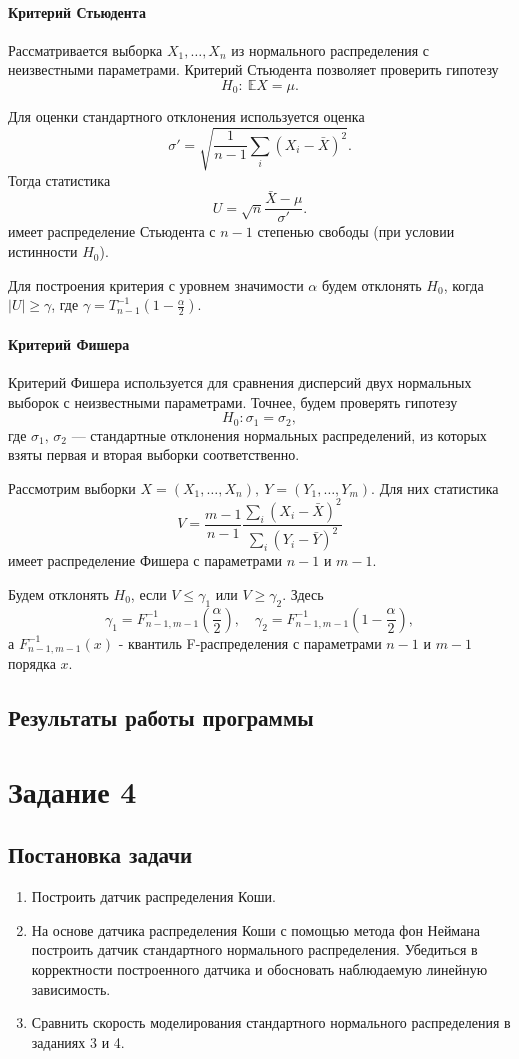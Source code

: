 \documentclass[16pt]{article}
\begin{document}
\paragraph{Критерий Стьюдента}
Рассматривается выборка $X_1, \ldots, X_n$ из нормального распределения с неизвестными параметрами. Критерий Стьюдента позволяет проверить гипотезу
$$H_0\colon\ \mathbb{E}X = \mu.$$

Для оценки стандартного отклонения используется оценка
$$\sigma' = \sqrt{\dfrac{1}{n-1}\sum_i(X_i - \bar X)^2}.$$
Тогда статистика
$$U = \sqrt{n}\frac{\bar X - \mu}{\sigma'}.$$
имеет распределение Стьюдента с $n - 1$ степенью свободы (при условии истинности $H_0$).

Для построения критерия с уровнем значимости $\alpha$ будем отклонять $H_0$,
когда $|U| \geq \gamma$, где $\gamma = T_{n - 1}^{-1}\left(1 - \frac{\alpha}{2}\right).$

\paragraph{Критерий Фишера}
Критерий Фишера используется для сравнения дисперсий двух нормальных выборок с неизвестными параметрами. Точнее, будем проверять гипотезу
$$H_0\colon \sigma_1 = \sigma_2,$$
где $\sigma_1, \, \sigma_2$ --- стандартные отклонения нормальных распределений, из которых взяты первая и вторая выборки соответственно.

Рассмотрим выборки $X = (X_1, \ldots, X_n), \ Y = (Y_1, \ldots, Y_m)$. Для них статистика
$$ V = \dfrac{m-1}{n-1}\dfrac{\sum_i(X_i - \bar X)^2}{\sum_i(Y_i - \bar Y)^2}$$ 
имеет распределение Фишера с параметрами $n - 1$ и $m - 1$.

Будем отклонять $H_0$, если $V \leq \gamma_1$ или $V \geq \gamma_2$. Здесь
$$\gamma_1 = F_{n-1, m-1}^{-1}\left(\frac{\alpha}{2}\right), \quad
\gamma_2 = F_{n-1, m-1}^{-1}\left(1 - \frac{\alpha}{2}\right),$$  а $F_{n-1, m-1}^{-1}(x)$ - квантиль F-распределения с параметрами $n - 1$ и $m - 1$ порядка $x$.
\subsection{Результаты работы программы}

\section{Задание 4}
\subsection{Постановка задачи}
\begin{enumerate}
\item Построить датчик распределения Коши.
\item На основе датчика распределения Коши с помощью метода фон Неймана построить датчик стандартного нормального распределения. Убедиться в корректности построенного датчика и обосновать наблюдаемую линейную зависимость.
\item Сравнить скорость моделирования стандартного нормального распределения в заданиях 3 и 4.
\end{enumerate}
\end{document}
